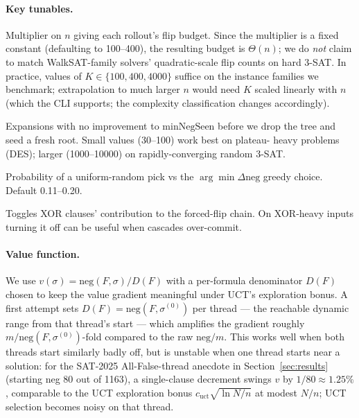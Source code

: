 \documentclass[11pt]{article}
\begin{document}
\paragraph{Key tunables.}
\begin{description}\itemsep0pt
\item[\texttt{playoutFlipBudgetMult}] Multiplier on $n$ giving each
      rollout's flip budget. Since the multiplier is a fixed constant
      (defaulting to 100--400), the resulting budget is $\Theta(n)$;
      we do \emph{not} claim to match WalkSAT-family solvers'
      quadratic-scale flip counts on hard 3-SAT. In practice, values
      of $K \in \{100, 400, 4000\}$ suffice on the instance families
      we benchmark; extrapolation to much larger $n$ would need
      $K$ scaled linearly with $n$ (which the CLI supports; the
      complexity classification changes accordingly).
\item[\texttt{restartStallThreshold}] Expansions with no
      improvement to $\text{minNegSeen}$ before we drop the tree and
      seed a fresh root. Small values (30--100) work best on plateau-
      heavy problems (DES); larger (1000--10000) on rapidly-converging
      random 3-SAT.
\item[\texttt{walksatNoise}] Probability of a uniform-random pick vs
      the $\arg\min \Delta\mathrm{neg}$ greedy choice. Default 0.11--0.20.
\item[\texttt{xorUnitPropagation}] Toggles XOR clauses' contribution
      to the forced-flip chain. On XOR-heavy inputs turning it off
      can be useful when cascades over-commit.
\end{description}

\paragraph{Value function.} We use
$v(\sigma) = \mathrm{neg}(F,\sigma) / D(F)$
with a per-formula denominator $D(F)$ chosen to keep the value
gradient meaningful under UCT's exploration bonus. A first attempt
sets $D(F) = \mathrm{neg}(F,\sigma^{(0)})$ per thread — the reachable
dynamic range from that thread's start — which amplifies the
gradient roughly $m / \mathrm{neg}(F,\sigma^{(0)})$-fold compared to
the raw $\mathrm{neg}/m$. This works well when both threads start
similarly badly off, but is unstable when one thread starts near a
solution: for the SAT-2025 All-False-thread anecdote in
Section~\ref{sec:results} (starting neg 80 out of 1163), a
single-clause decrement swings $v$ by
$1/80 \approx 1.25\%$, comparable to the UCT exploration bonus
$c_\text{uct}\sqrt{\ln N/n}$ at modest $N/n$; UCT selection becomes
noisy on that thread.
\end{document}
